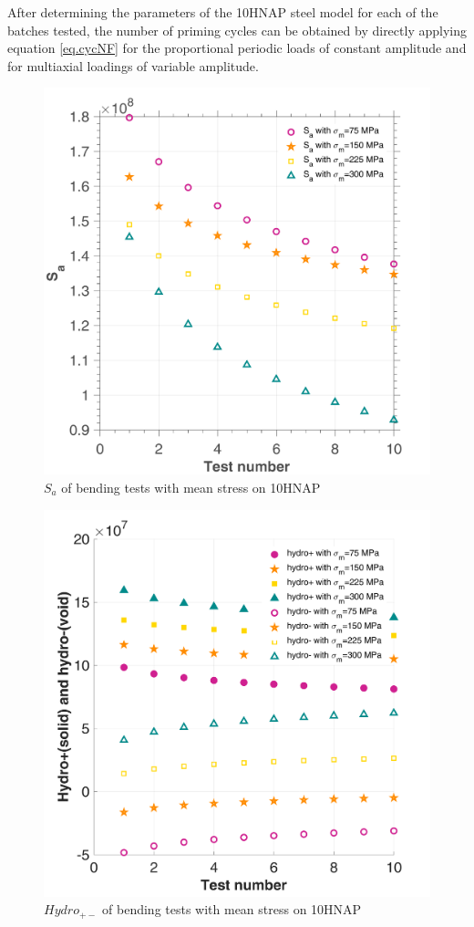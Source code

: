 \documentclass[3p,times,procedia,number]{elsarticle}
\begin{document}
After determining the parameters of the 10HNAP steel model for each of the batches tested, the number of priming cycles can be obtained by directly applying equation \eqref{eq.cycNF} for the proportional periodic loads of constant amplitude and for multiaxial loadings of variable amplitude.
\begin{figure}[!h]
	\centering
	\includegraphics[width=\textwidth]{figures//10HNAP_b1D_m_Smax.png} 
	\caption{$S_{a}$ of bending tests with mean stress on 10HNAP}
	\label{fig.10HNAPSmax}
\end{figure}
\begin{figure}[!h]
	\centering
	\includegraphics[width=\textwidth]{figures//10HNAP_b1D_m_hydro.png} 
	\caption{$Hydro_{+-}$ of bending tests with mean stress on 10HNAP}
	\label{fig.10HNAPhydro}
\end{figure}
\end{document}
